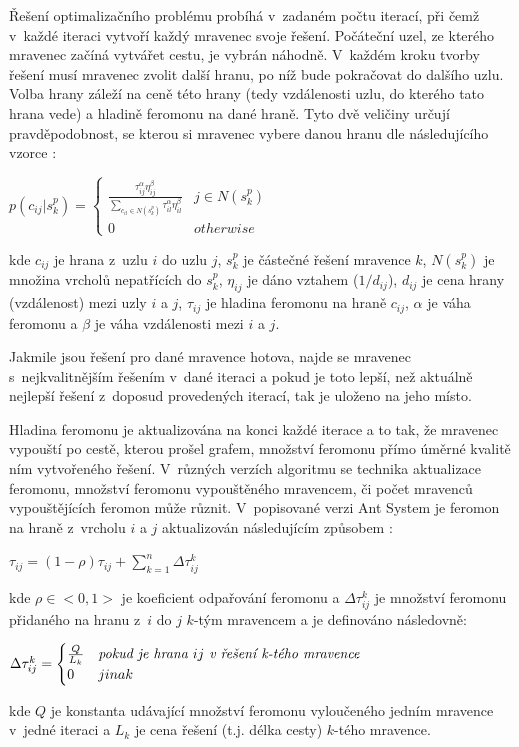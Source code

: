 \documentclass[a4paper, 12pt]{article}
\begin{document}
Řešení optimalizačního problému probíhá v~zadaném počtu iterací, při čemž v~každé iteraci vytvoří každý mravenec svoje řešení.
Počáteční uzel, ze kterého mravenec začíná vytvářet cestu, je vybrán náhodně.
V~každém kroku tvorby řešení musí mravenec zvolit další hranu, po níž bude pokračovat do dalšího uzlu. Volba hrany záleží na ceně této hrany (tedy vzdálenosti
uzlu, do kterého tato hrana vede) a hladině feromonu na dané hraně. Tyto dvě veličiny určují pravděpodobnost,
se kterou si mravenec vybere danou hranu dle následujícího vzorce \cite{aco:variations}:
\begin{center}
  $p(c_{ij}|s_k^p) =
   \begin{cases} 
      \frac{\tau^{\alpha}_{ij}\eta^{\beta}_{ij}}{\sum\limits_{c_{il}\in N(s_k^p)}{\tau^\alpha_{il}\eta^\beta_{il}}} & j \in N(s_k^p) \\
      0 & otherwise 
   \end{cases}
   $
\end{center}
kde $c_{ij}$ je hrana z~uzlu $i$ do uzlu $j$, $s_k^p$ je částečné řešení mravence $k$, $N(s_k^p)$ je množina vrcholů nepatřících do $s_k^p$, $\eta_{ij}$ je 
dáno vztahem ($1/d_{ij}$), $d_{ij}$ je cena hrany (vzdálenost) mezi uzly $i$ a $j$, $\tau_{ij}$ je hladina feromonu na hraně $c_{ij}$, $\alpha$
je váha feromonu a $\beta$ je váha vzdálenosti mezi $i$ a $j$.

Jakmile jsou řešení pro dané mravence hotova, najde se mravenec s~nejkvalitnějším řešením v~dané iteraci a pokud je toto lepší, než aktuálně nejlepší řešení
z~doposud provedených iterací, tak je uloženo na jeho místo.

Hladina feromonu je aktualizována na konci každé iterace a to tak, že mravenec vypouští po cestě, kterou prošel grafem, množství feromonu přímo úměrné kvalitě
ním vytvořeného řešení. V~různých verzích algoritmu se technika aktualizace feromonu, množství feromonu vypouštěného mravencem, či počet mravenců vypouštějících 
feromon může různit. V~popisované verzi Ant System je feromon na hraně z~vrcholu $i$ a $j$ aktualizován následujícím způsobem \cite{aco:variations}:
\begin{center}
  $\tau_{ij}=(1-\rho)\tau_{ij}+\sum\limits_{k=1}^{n}\Delta\tau_{ij}^k$
\end{center}
kde $\rho \in <0,1>$ je koeficient odpařování feromonu
a $\Delta\tau_{ij}^k$ je množství feromonu přidaného na hranu z~$i$ do $j$ $k$-tým mravencem a je definováno následovně:
\begin{center}
  $\Delta\tau_{ij}^k = 
  \begin{cases}
    \frac{Q}{L_k} & \emph{pokud je hrana } ij \emph{ v~řešení k-tého mravence}\\
    0 & jinak
   \end{cases}
   $
\end{center}
kde $Q$ je konstanta udávající množství feromonu vyloučeného jedním mravence v~jedné iteraci a $L_k$ je cena řešení (t.j. délka cesty) $k$-tého mravence.
\end{document}
